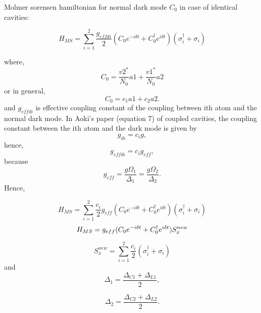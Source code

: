 \documentclass{article}
\begin{document}
Molmer sorensen hamiltonian for normal dark mode $C_0$ in case of identical cavities:

\begin{equation}
    H_{MS} = \sum_{i=1}^{2} \frac{g_{effdi}}{2} (C_0 e^{-i \delta t} + C_0^{\dagger} e^{i \delta t}) (\sigma^{\dagger}_i+\sigma_i) 
\end{equation}

where,
\begin{equation}
 C_0 = \frac{v2^*}{N_0} a1 + \frac{v1^*}{N_0} a2   
\end{equation}
or in general,
\begin{equation}
 C_0 = c_1 a1 + c_2 a2.    
\end{equation}
and $g_{effdi}$ is effective coupling constant of the coupling between ith atom and the normal dark mode. 
In Aoki's paper (equation 7) of coupled cavities, the coupling constant between the ith atom and the dark mode is given by 
\begin{equation}
    g_{di} = c_{i} g,
\end{equation}
hence,
\begin{equation}
    g_{effdi} = c_{i} g_{eff},
\end{equation}
because
\begin{equation}
    g_{eff} = \frac{g\Omega_1}{\Delta_1} = \frac{g\Omega_2}{\Delta_2}.
\end{equation}
Hence,

\begin{equation}
    H_{MS} = \sum_{i=1}^{2} \frac{c_i}{2} g_{eff}(C_0 e^{-i \delta t} + C_0^{\dagger} e^{i \delta t}) (\sigma^{\dagger}_i+\sigma_i) 
\end{equation}
 \begin{equation}
 \label{H_{MS}}
    H_{MS} = g_{eff} (C_{0} e^{-i \delta t} + C_{0}^{\dagger} e^{i \delta t}) S_x^{new} 
\end{equation}

\begin{equation}
    S_{x}^{new} = \sum_{i=1}^{2} \frac{c_i}{2} (\sigma^{\dagger}_i+\sigma_i)  
\end{equation}
and
\begin{equation}
    \Delta_1 = \frac{\Delta_{C1} + \Delta_{L1}}{2},
\end{equation}

\begin{equation}
    \Delta_2 = \frac{\Delta_{C2} + \Delta_{L2}}{2}.
\end{equation}
\end{document}
